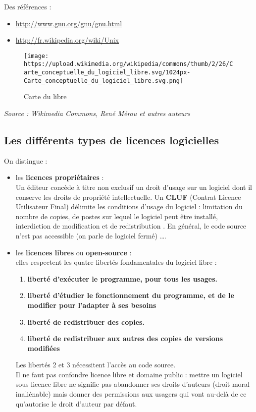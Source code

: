 \documentclass[
  11pt,
]{article}
\newcounter{prop}
\newcounter{def}
\newcounter{prog}
\newcounter{logi}
\begin{document}
Des références :

\begin{itemize}
\item
  \url{http://www.gnu.org/gnu/gnu.html}
\item
  \url{http://fr.wikipedia.org/wiki/Unix}
\end{itemize}

\begin{figure}
\centering
\texttt{[image: https://upload.wikimedia.org/wikipedia/commons/thumb/2/26/Carte\_conceptuelle\_du\_logiciel\_libre.svg/1024px-Carte\_conceptuelle\_du\_logiciel\_libre.svg.png]}
\caption{Carte du libre}
\end{figure}

\emph{Source : Wikimedia Commons, René Mérou et autres auteurs}

\hypertarget{les-diffuxe9rents-types-de-licences-logicielles}{%
\subsection{Les différents types de licences
logicielles}\label{les-diffuxe9rents-types-de-licences-logicielles}}

On distingue :

\begin{itemize}
\item
  les \textbf{licences propriétaires} :\\
  Un éditeur concède à titre non exclusif un droit d'usage sur un
  logiciel dont il conserve les droits de propriété intellectuelle. Un
  \textbf{CLUF} (Contrat Licence Utilisateur Final) délimite les
  conditions d'usage du logiciel : limitation du nombre de copies, de
  postes sur lequel le logiciel peut être installé, interdiction de
  modification et de redistribution . En général, le code source n'est
  pas accessible (on parle de logiciel fermé) \ldots{}.
\item
  les \textbf{licences libres} ou \textbf{open-source} :\\
  elles respectent les quatre libertés fondamentales du logiciel libre :

  \begin{enumerate}
  \def\labelenumi{\arabic{enumi}.}
  \item
    \textbf{liberté d'exécuter le programme, pour tous les usages.}
  \item
    \textbf{liberté d'étudier le fonctionnement du programme, et de le
    modifier pour l'adapter à ses besoins}
  \item
    \textbf{liberté de redistribuer des copies.}
  \item
    \textbf{liberté de redistribuer aux autres des copies de versions
    modifiées}
  \end{enumerate}

  Les libertés 2 et 3 nécessitent l'accès au code source.\\
  Il ne faut pas confondre licence libre et domaine public : mettre un
  logiciel sous licence libre ne signifie pas abandonner ses droits
  d'auteurs (droit moral inaliénable) mais donner des permissions aux
  usagers qui vont au-delà de ce qu'autorise le droit d'auteur par
  défaut.
\end{itemize}
\end{document}
